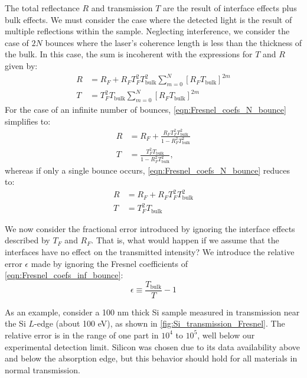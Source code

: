 The total reflectance $R$ and transmission $T$ are the result of interface effects plus bulk effects. We must consider the case where the detected light is the result of multiple reflections within the sample. Neglecting interference, we consider the case of $2N$ bounces where the laser's coherence length is less than the thickness of the bulk. In this case, the sum is incoherent with the expressions for $T$ and $R$ given by:
\begin{equation}
\begin{aligned}
R &= R_F + R_F T_F^2 T_{\text{bulk}}^2 \sum_{m=0}^{N} \left[ R_F T_{\text{bulk}} \right]^{2m} \\
T &= T_F^2 T_{\text{bulk}} \sum_{m=0}^{N} \left[ R_F T_{\text{bulk}} \right]^{2m}
\end{aligned}
\label{eqn:Fresnel_coefs_N_bounce}
\end{equation}
For the case of an infinite number of bounces, \cref{eqn:Fresnel_coefs_N_bounce} simplifies to:
\begin{equation}
\begin{aligned}
R &= R_F + \frac{R_F T_F^2 T_{\text{bulk}}^2}{1-R_F^2 T_{\text{bulk}}^2} \\
T &= \frac{T_F^2 T_{\text{bulk}}}{1-R_F^2 T_{\text{bulk}}^2},
\end{aligned}
\label{eqn:Fresnel_coefs_inf_bounce}
\end{equation}
whereas if only a single bounce occurs, \cref{eqn:Fresnel_coefs_N_bounce} reduces to:
\begin{equation}
\begin{aligned}
R &= R_F + R_F T_F^2 T_{\text{bulk}}^2 \\
T &= T_F^2 T_{\text{bulk}}
\end{aligned}
\label{eqn:Fresnel_coefs_1_bounce}
\end{equation}

We now consider the fractional error introduced by ignoring the interface effects described by $T_F$ and $R_F$. That is, what would happen if we assume that the interfaces have no effect on the transmitted intensity? We introduce the relative error $\epsilon$ made by ignoring the Fresnel coefficients of \cref{eqn:Fresnel_coefs_inf_bounce}:
\begin{equation}
\epsilon \equiv \frac{T_{\text{bulk}}}{T} - 1
\label{eqn:Fresnel_rel_err}
\end{equation}

As an example, consider a 100 nm thick Si sample measured in transmission near the Si $L$-edge (about 100 eV), as shown in \cref{fig:Si_transmission_Fresnel}. The relative error is in the range of one part in $10^4$ to $10^5$, well below our experimental detection limit. Silicon was chosen due to its data availability above and below the absorption edge, but this behavior should hold for all materials in normal transmission.

